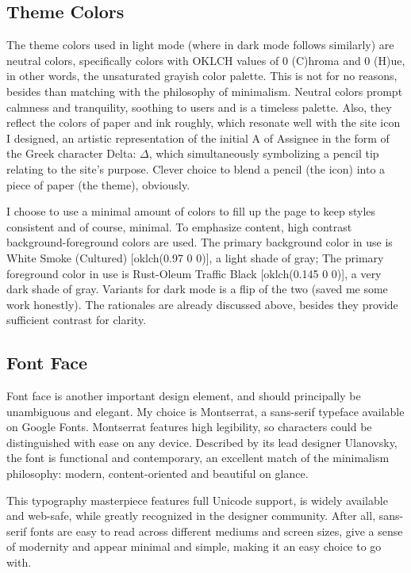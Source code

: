 \documentclass[12pt]{report}
\newcommand{\n}{\par}
\begin{document}
\subsection{Theme Colors} \label{presentation-layer.design.theme-colors}
The theme colors used in light mode (where in dark mode follows similarly) are neutral colors,
specifically colors with OKLCH values of 0 (C)hroma and 0 (H)ue, in other words, the unsaturated grayish color palette.
This is not for no reasons, besides than matching with the philosophy of minimalism.
Neutral colors prompt calmness and tranquility, soothing to users and is a timeless palette.
Also, they reflect the colors of paper and ink roughly,
which resonate well with the site icon I designed, an artistic representation of the initial A of Assignee
in the form of the Greek character Delta: $\Delta$, which simultaneously symbolizing a pencil tip relating to the site's purpose.
Clever choice to blend a pencil (the icon) into a piece of paper (the theme), obviously.\n
I choose to use a minimal amount of colors to fill up the page to keep styles consistent and of course, minimal.
To emphasize content, high contrast background-foreground colors are used.
The primary background color in use is White Smoke (Cultured) [oklch(0.97 0 0)], a light shade of gray;
The primary foreground color in use is Rust-Oleum Traffic Black [oklch(0.145 0 0)], a very dark shade of gray.
Variants for dark mode is a flip of the two (saved me some work honestly).
The rationales are already discussed above, besides they provide sufficient contrast for clarity.


\subsection{Font Face} \label{presentation-layer.design.font-face}
Font face is another important design element, and should principally be unambiguous and elegant.
My choice is Montserrat, a sans-serif typeface available on Google Fonts.
Montserrat features high legibility, so characters could be distinguished with ease on any device.
Described by its lead designer Ulanovsky, the font is functional and contemporary,
an excellent match of the minimalism philosophy: modern, content-oriented and beautiful on glance.\n
This typography masterpiece features full Unicode support, is widely available and web-safe,
while greatly recognized in the designer community.
After all, sans-serif fonts are easy to read across different mediums and screen sizes,
give a sense of modernity and appear minimal and simple, making it an easy choice to go with.
\end{document}
